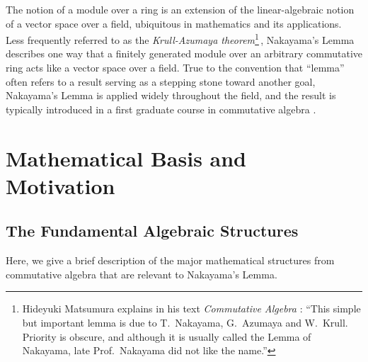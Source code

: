 \documentclass{article}
\begin{document}
The notion of a module over a ring is an extension of the linear-algebraic notion of a vector space over a field, ubiquitous in mathematics and its applications. 
Less frequently referred to as the \emph{Krull-Azumaya theorem}\footnote{Hideyuki Matsumura explains in his text \emph{Commutative Algebra} \cite{matsumura}:  ``{This simple but important lemma is due to T.\ Nakayama, G.\ Azumaya
and W.\ Krull. Priority is obscure, and although it is usually called the Lemma of Nakayama, late Prof.\  Nakayama did not like the name.''}}\,\cite{nagata}, Nakayama's Lemma 
describes one way that a finitely generated module over an arbitrary commutative ring acts like a vector space over a field.  
True to the convention that ``lemma'' often refers to a result serving as a stepping stone toward another goal, Nakayama's Lemma is applied widely throughout the field, and the result is typically introduced in a first graduate course in commutative algebra \cite{atiyah-macdonald, matsumura, eisenbud}.   






\section{Mathematical Basis and Motivation}

\subsection{The Fundamental Algebraic Structures} 

Here, we give a brief description of the major mathematical structures from commutative algebra that are relevant to Nakayama's Lemma.

\end{document}

